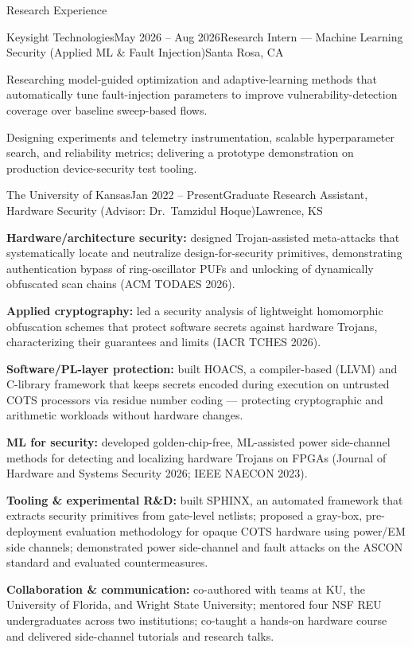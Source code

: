 \begin{rSection}{Research Experience}

\begin{rSubsection}{Keysight Technologies}{May 2026 -- Aug 2026}{Research Intern --- Machine Learning Security (Applied ML \& Fault Injection)}{Santa Rosa, CA}
\item Researching model-guided optimization and adaptive-learning methods that automatically tune fault-injection parameters to improve vulnerability-detection coverage over baseline sweep-based flows.
\item Designing experiments and telemetry instrumentation, scalable hyperparameter search, and reliability metrics; delivering a prototype demonstration on production device-security test tooling.
\end{rSubsection}

\begin{rSubsection}{The University of Kansas}{Jan 2022 -- Present}{Graduate Research Assistant, Hardware Security (Advisor: Dr.\ Tamzidul Hoque)}{Lawrence, KS}
\item \textbf{Hardware/architecture security:} designed Trojan-assisted meta-attacks that systematically locate and neutralize design-for-security primitives, demonstrating authentication bypass of ring-oscillator PUFs and unlocking of dynamically obfuscated scan chains (ACM TODAES 2026).
\item \textbf{Applied cryptography:} led a security analysis of lightweight homomorphic obfuscation schemes that protect software secrets against hardware Trojans, characterizing their guarantees and limits (IACR TCHES 2026).
\item \textbf{Software/PL-layer protection:} built HOACS, a compiler-based (LLVM) and C-library framework that keeps secrets encoded during execution on untrusted COTS processors via residue number coding --- protecting cryptographic and arithmetic workloads without hardware changes.
\item \textbf{ML for security:} developed golden-chip-free, ML-assisted power side-channel methods for detecting and localizing hardware Trojans on FPGAs (Journal of Hardware and Systems Security 2026; IEEE NAECON 2023).
\item \textbf{Tooling \& experimental R\&D:} built SPHINX, an automated framework that extracts security primitives from gate-level netlists; proposed a gray-box, pre-deployment evaluation methodology for opaque COTS hardware using power/EM side channels; demonstrated power side-channel and fault attacks on the ASCON standard and evaluated countermeasures.
\item \textbf{Collaboration \& communication:} co-authored with teams at KU, the University of Florida, and Wright State University; mentored four NSF REU undergraduates across two institutions; co-taught a hands-on hardware course and delivered side-channel tutorials and research talks.
\end{rSubsection}

\end{rSection}
